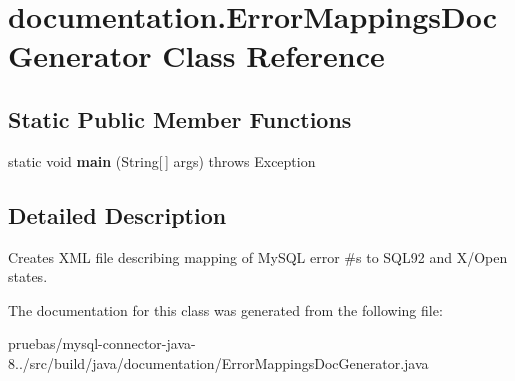\hypertarget{classdocumentation_1_1_error_mappings_doc_generator}{}\section{documentation.\+Error\+Mappings\+Doc\+Generator Class Reference}
\label{classdocumentation_1_1_error_mappings_doc_generator}
\subsection*{Static Public Member Functions}
\begin{DoxyCompactItemize}
\item 
\mbox{\label{classdocumentation_1_1_error_mappings_doc_generator_a4d220d7973be2cc09433cd551bdd8c28}} 
static void {\bfseries main} (String\mbox{[}$\,$\mbox{]} args)  throws Exception 
\end{DoxyCompactItemize}


\subsection{Detailed Description}
Creates X\+ML file describing mapping of My\+S\+QL error \#\textquotesingle{}s to S\+Q\+L92 and X/\+Open states. 

The documentation for this class was generated from the following file\+:\begin{DoxyCompactItemize}
\item 
pruebas/mysql-\/connector-\/java-\/8../src/build/java/documentation/Error\+Mappings\+Doc\+Generator.\+java\end{DoxyCompactItemize}
